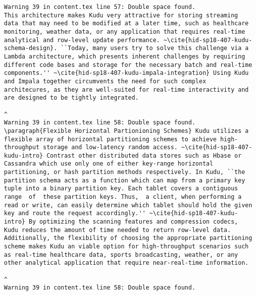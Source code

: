 \begin{tiny}
\begin{verbatim}
Warning 39 in content.tex line 57: Double space found.
This architecture makes Kudu very attractive for storing streaming data that may need to be modified at a later time, such as healthcare monitoring, weather data, or any application that requires real-time analytical and row-level update performance. ~\cite{hid-sp18-407-kudu-schema-design}. ``Today, many users try to solve this challenge via a Lambda architecture, which presents inherent challenges by requiring different code bases and storage for the necessary batch and real-time components.'' ~\cite{hid-sp18-407-kudu-impala-integration} Using Kudu and Impala together circumvents the need for such complex architecures, as they are well-suited for real-time interactivity and are designed to be tightly integrated.  
                                                                                                                                                                                                                                                                                                                                                                                                                                                                                                                   ^
Warning 39 in content.tex line 58: Double space found.
\paragraph{Flexible Horizontal Partionioning Schemes} Kudu utilizes a flexible array of horizontal partitioning schemes to achieve high-throughput storage and low-latency random access. ~\cite{hid-sp18-407-kudu-intro} Contrast other distributed data stores such as Hbase or Cassandra which use only one of either key-range horizontal partitioning, or hash partition methods respectively. In Kudu, ``the partition schema acts as a function which can map from a primary key tuple into a binary partition key. Each tablet covers a contiguous  range  of  these partition keys. Thus,  a client, when performing a read or write, can easily determine which tablet should hold the given key and route the request accordingly.'' ~\cite{hid-sp18-407-kudu-intro} By optimizing the scanning features and compression codecs, Kudu reduces the amount of time needed to return row-level data. Additionally, the flexibility of choosing the appropriate partitioning scheme makes Kudu an viable option for high-throughput scenarios such as real-time healthcare data, sports broadcasting, weather, or any other analytical application that require near-real-time information.  
                                                                                                                                                                                         ^
Warning 39 in content.tex line 58: Double space found.

\end{verbatim}
\end{tiny}
